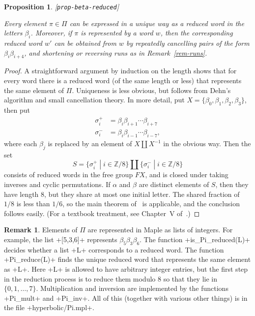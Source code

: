 \documentclass[reqno]{amsart}
\newcommand{\lbl}[1]{\label{#1}\textup{[\texttt{#1}]}\par}
\newcommand{\lbl}{\label}
\newcommand{\al}        {\alpha}
\newcommand{\bt}        {\beta}
\newcommand{\sg}        {\sigma}
\newcommand{\Z}         {{\mathbb{Z}}}
\newcommand{\st}        {\;|\;}
\renewcommand{\:}{\colon}
\newtheorem{proposition}[theorem]{Proposition}
\theoremstyle{definition}
\newtheorem{remark}[theorem]{Remark}
\begin{document}
\begin{proposition}\lbl{prop-beta-reduced}
 Every element $\pi\in\Pi$ can be expressed in a unique way as a reduced
 word in the letters $\bt_i$.  Moreover, if $\pi$ is represented by a
 word $w$, then the corresponding reduced word $w'$ can be obtained
 from $w$ by repeatedly cancelling pairs of the form $\bt_i\bt_{i+4}$,
 and shortening or reversing runs as in Remark~\ref{rem-runs}.
\end{proposition}
\begin{proof}
 A straightforward argument by induction on the length shows that for
 every word there is a reduced word (of the same length or less) that
 represents the same element of $\Pi$.  Uniqueness is less obvious,
 but follows from Dehn's algorithm and small cancellation theory.  In
 more detail, put $X=\{\bt_0,\bt_1,\bt_2,\bt_3\}$, then put
 \begin{align*}
  \sg_i^+ &= \bt_i\bt_{i+1}\dotsb\bt_{i+7} \\
  \sg_i^- &= \bt_i\bt_{i-1}\dotsb\bt_{i-7},
 \end{align*}
 where each $\bt_j$ is replaced by an element of $X\amalg X^{-1}$ in
 the obvious way.  Then the set
 \[ S=\{\sg_i^+\st i\in\Z/8\} \amalg \{\sg_i^-\st i\in\Z/8\} \]
 consists of reduced words in the free group $FX$, and is closed under
 taking inverses and cyclic permutations.  If $\al$ and $\bt$ are
 distinct elements of $S$, then they have length $8$, but they share at
 most one initial letter.  The shared fraction of $1/8$ is less than
 $1/6$, so the main theorem of~\cite{gr:daw} is applicable, and the
 conclusion follows easily.  (For a textbook treatment, see Chapter~V
 of~\cite{lysc:cgt}.)
\end{proof}
\begin{remark}
 Elements of $\Pi$ are represented in Maple as lists of integers.  For
 example, the list \mcode+[5,3,6]+ represents $\bt_5\bt_3\bt_6$.  The
 function \mcode+is_Pi_reduced(L)+ decides whether a list \mcode+L+
 corresponds to a reduced word.  The function \mcode+Pi_reduce(L)+
 finds the unique reduced word that represents the same element as
 \mcode+L+.  Here \mcode+L+ is allowed to have arbitrary integer
 entries, but the first step in the reduction process is to reduce
 them modulo $8$ so that they lie in $\{0,1,\dotsc,7\}$.
 Multiplication and inversion are implemented by the functions
 \mcode+Pi_mult+ and \mcode+Pi_inv+.  All of this (together with
 various other things) is in the file \fname+hyperbolic/Pi.mpl+.
\end{remark}
\end{document}
